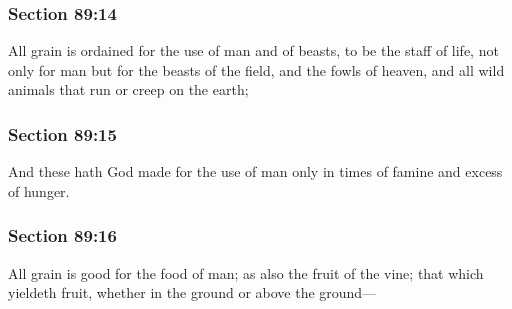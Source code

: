 	\subsubsection{Section 89:14} %
		\label{DC89-14}

		All grain is ordained for the use of man and of beasts, to be the staff of life, not only for man but for the beasts of the field, and the fowls of heaven, and all wild animals that run or creep on the earth;


	\subsubsection{Section 89:15} %
		\label{DC89-15}

		And these hath God made for the use of man only in times of famine and excess of hunger.


	\subsubsection{Section 89:16} %
		\label{DC89-16}

		All grain is good for the food of man; as also the fruit of the vine; that which yieldeth fruit, whether in the ground or above the ground---


